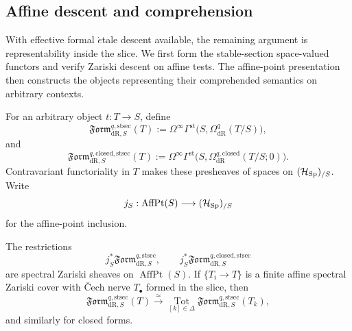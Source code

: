 \subsection{Affine descent and comprehension}

With effective formal \(\acute{e}\)tale descent available, the remaining
argument is representability inside the slice. We first form the stable-section
space-valued functors and verify Zariski descent on affine tests. The
affine-point presentation then constructs the objects representing their
comprehended semantics on arbitrary contexts.

\begin{definition}
\label{def:intrinsic-form-space-functors}
For an arbitrary object \(t:T\to S\), define
\[
  \mathfrak{Form}^{q,\mathrm{stsec}}_{\mathrm{dR},S}(T)
  :=
  \Omega^\infty
  \Gamma^{\mathrm{st}}
  \bigl(S,\Omega^q_{\mathrm{dR}}(T/S)\bigr),
\]
and
\[
  \mathfrak{Form}^{q,\mathrm{closed},\mathrm{stsec}}_{\mathrm{dR},S}(T)
  :=
  \Omega^\infty
  \Gamma^{\mathrm{st}}
  \bigl(S,\Omega^{q,\mathrm{closed}}_{\mathrm{dR}}(T/S;0)\bigr).
\]
Contravariant functoriality in \(T\) makes these presheaves of spaces on
\((\mathcal H_{\operatorname{Sp}})_{/S}\). Write
\[
  j_S:\operatorname{AffPt}(S)\longrightarrow(\mathcal H_{\operatorname{Sp}})_{/S}
\]
for the affine-point inclusion.
\end{definition}

\begin{proposition}
\label{prop:affine-test-descent-form-moduli}
The restrictions
\[
  j_S^*\mathfrak{Form}^{q,\mathrm{stsec}}_{\mathrm{dR},S},
  \qquad
  j_S^*\mathfrak{Form}^{q,\mathrm{closed},\mathrm{stsec}}_{\mathrm{dR},S}
\]
are spectral Zariski sheaves on \(\operatorname{AffPt}(S)\). If
\(\{T_i\to T\}\) is a finite affine spectral Zariski cover with \v{C}ech nerve
\(T_\bullet\) formed in the slice, then
\[
  \mathfrak{Form}^{q,\mathrm{stsec}}_{\mathrm{dR},S}(T)
  \xrightarrow{\simeq}
  \operatorname*{Tot}_{[k]\in\Delta}
  \mathfrak{Form}^{q,\mathrm{stsec}}_{\mathrm{dR},S}(T_k),
\]
and similarly for closed forms.
\end{proposition}

